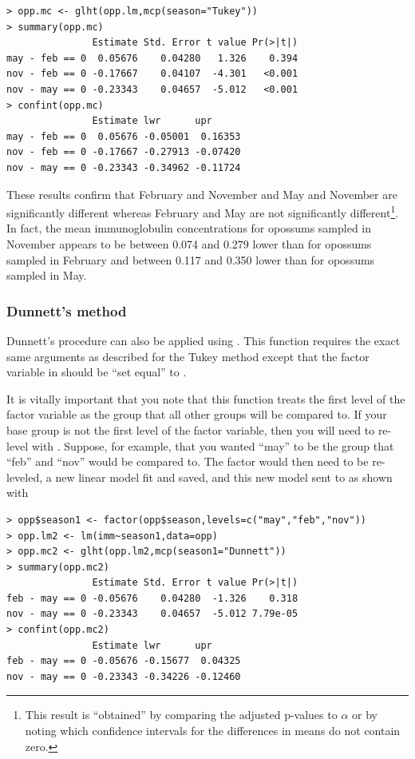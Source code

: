 \documentclass[10pt,openany]{book}\usepackage[]{graphicx}\usepackage[]{color}
\makeatletter
\newenvironment{kframe}{%
 \def\at@end@of@kframe{}%
 \ifinner\ifhmode%
  \def\at@end@of@kframe{\end{minipage}}%
  \begin{minipage}{\columnwidth}%
 \fi\fi%
 \def\FrameCommand##1{\hskip\@totalleftmargin \hskip-\fboxsep
 \colorbox{shadecolor}{##1}\hskip-\fboxsep
     \hskip-\linewidth \hskip-\@totalleftmargin \hskip\columnwidth}%
 \MakeFramed {\advance\hsize-\width
   \@totalleftmargin\z@ \linewidth\hsize
   \@setminipage}}%
 {\par\unskip\endMakeFramed%
 \at@end@of@kframe}
\newenvironment{knitrout}{}{} %
\makeatother
\begin{document}
\begin{knitrout}
\color{fgcolor}\begin{kframe}
\begin{verbatim}
> opp.mc <- glht(opp.lm,mcp(season="Tukey"))
> summary(opp.mc)
               Estimate Std. Error t value Pr(>|t|)
may - feb == 0  0.05676    0.04280   1.326    0.394
nov - feb == 0 -0.17667    0.04107  -4.301   <0.001
nov - may == 0 -0.23343    0.04657  -5.012   <0.001
> confint(opp.mc)
               Estimate lwr      upr     
may - feb == 0  0.05676 -0.05001  0.16353
nov - feb == 0 -0.17667 -0.27913 -0.07420
nov - may == 0 -0.23343 -0.34962 -0.11724
\end{verbatim}
\end{kframe}
\end{knitrout}
These results confirm that February and November and May and November are significantly different whereas February and May are not significantly different\footnote{This result is ``obtained'' by comparing the adjusted p-values to $\alpha$ or by noting which confidence intervals for the differences in means do not contain zero.}.  In fact, the mean immunoglobulin concentrations for opossums sampled in November appears to be between 0.074 and 0.279 lower than for opossums sampled in February and between 0.117 and 0.350 lower than for opossums sampled in May.


\subsubsection*{Dunnett's method}
Dunnett's procedure can also be applied using .  This function requires the exact same arguments as described for the Tukey method except that the factor variable in  should be ``set equal'' to .

It is vitally important that you note that this function treats the first level of the factor variable as the group that all other groups will be compared to.  If your base group is not the first level of the factor variable, then you will need to re-level with .  Suppose, for example, that you wanted ``may'' to be the group that ``feb'' and ``nov'' would be compared to.  The factor would then need to be re-leveled, a new linear model fit and saved, and this new model sent to  as shown with

\begin{knitrout}
\color{fgcolor}\begin{kframe}
\begin{verbatim}
> opp$season1 <- factor(opp$season,levels=c("may","feb","nov"))
> opp.lm2 <- lm(imm~season1,data=opp)
> opp.mc2 <- glht(opp.lm2,mcp(season1="Dunnett"))
> summary(opp.mc2)
               Estimate Std. Error t value Pr(>|t|)
feb - may == 0 -0.05676    0.04280  -1.326    0.318
nov - may == 0 -0.23343    0.04657  -5.012 7.79e-05
> confint(opp.mc2)
               Estimate lwr      upr     
feb - may == 0 -0.05676 -0.15677  0.04325
nov - may == 0 -0.23343 -0.34226 -0.12460
\end{verbatim}
\end{kframe}
\end{knitrout}
\end{document}
